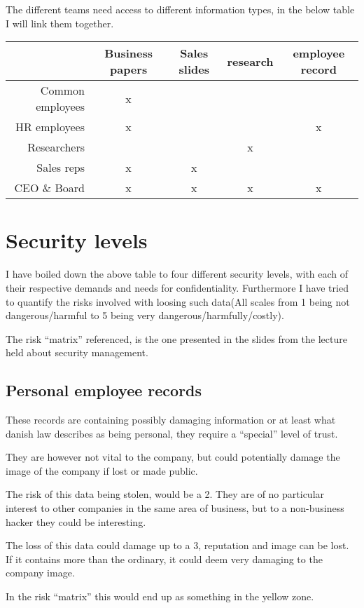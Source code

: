 \documentclass[paper=a4, fontsize=11pt]{scrartcl} %
\numberwithin{equation}{section} %
\numberwithin{figure}{section} %
\numberwithin{table}{section} %
\begin{document}
The different teams need access to different information types, in the below
table I will link them together.

\begin{tabular}{r | c | c | c | c}
 & Business papers & Sales slides & research & employee record \\ \hline
Common employees & x &   &   &   \\ \hline
HR employees     & x &   &   & x \\ \hline
Researchers      &   &   & x &   \\ \hline
Sales reps       & x & x &   &   \\ \hline
CEO \& Board     & x & x & x & x \\
\end{tabular}

\section{Security levels}
I have boiled down the above table to four different security levels, with each
of their respective demands and needs for confidentiality. Furthermore I have
tried to quantify the risks involved with loosing such data(All scales from 1
being not dangerous/harmful to 5 being very dangerous/harmfully/costly).

The risk ``matrix'' referenced, is the one presented in the slides from the
lecture held about security management.

\subsection{Personal employee records}
These records are containing possibly damaging information or at least what
danish law describes as being personal, they require a ``special'' level of
trust.

They are however not vital to the company, but could potentially damage the
image of the company if lost or made public.

The risk of this data being stolen, would be a 2. They are of no particular
interest to other companies in the same area of business, but to a non-business
hacker they could be interesting.

The loss of this data could damage up to a 3, reputation and image can be lost.
If it contains more than the ordinary, it could deem very damaging to the
company image.

In the risk ``matrix'' this would end up as something in the yellow zone.
\end{document}
